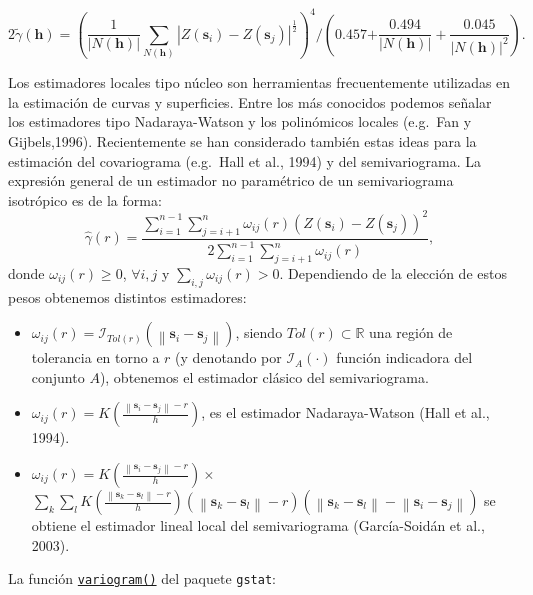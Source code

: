 \documentclass[
  spanish,
]{book}
\providecommand{\tightlist}{%
  \setlength{\itemsep}{0pt}\setlength{\parskip}{0pt}}
\theoremstyle{break}
\begin{document}
\[2\tilde{\gamma}(\mathbf{h}) = \left( \dfrac{1}{\left| N(\mathbf{h})\right| }
\sum\limits_{N(\mathbf{h})}\left| Z(\mathbf{s}_{i})-Z(\mathbf{s}_{j}
)\right|^{\frac{1}{2} } \right)^{4} /\left( \text{0.457+}
\dfrac{\text{0.494} }{\left| N(\mathbf{h})\right| } +\dfrac{\text{0.045}
}{\left| N(\mathbf{h})\right|^2 } \right).\]

Los estimadores locales tipo núcleo son herramientas frecuentemente utilizadas en la estimación de curvas y superficies.
Entre los más conocidos podemos señalar los estimadores tipo Nadaraya-Watson y los polinómicos locales (e.g.~Fan y Gijbels,1996).
Recientemente se han considerado también estas ideas para la estimación del covariograma (e.g.~Hall et al., 1994) y del semivariograma.
La expresión general de un estimador no paramétrico de un semivariograma isotrópico es de la forma:
\[\hat{\gamma}(r) = \dfrac{\sum\limits_{i=1}^{n-1}\sum\limits_{j=i+1}^{n}\omega_{ij}
(r)\left( Z(\mathbf{s}_{i})-Z(\mathbf{s}_{j})\right)^2  
}{2\sum\limits_{i=1}^{n-1}\sum\limits_{j=i+1}^{n}\omega_{ij}(r)},\]
donde \(\omega_{ij}(r) \geq 0\), \(\forall i,j\) y \(\sum_{i,j}\omega_{ij}(r) > 0\).
Dependiendo de la elección de estos pesos obtenemos distintos estimadores:

\begin{itemize}
\tightlist
\item
  \(\omega_{ij}(r) = \mathcal{I}_{Tol(r)} \left( \left\| \mathbf{s}_{i} - \mathbf{s}_{j} \right\| \right)\), siendo \(Tol(r)\subset \mathbb{R}\) una región de tolerancia en torno a \(r\) (y denotando por \(\mathcal{I}_{A}(\cdot)\) función indicadora del conjunto \(A\)), obtenemos el estimador clásico del semivariograma.
\item
  \(\omega_{ij}(r)=K\left( \frac{\left\| \mathbf{s}_{i} -\mathbf{s}_{j} \right\| -r}{h} \right)\), es el estimador Nadaraya-Watson (Hall et al., 1994).
\item
  \(\omega_{ij}(r)=K\left( \frac{\left\| \mathbf{s}_{i} -\mathbf{s}_{j} \right\| -r}{h} \right) \times\) \(\sum\limits_{k}\sum\limits_{l}K\left( \frac{\left\| \mathbf{s}_{k} -\mathbf{s}_{l} \right\| -r}{h} \right) \left( \left\| \mathbf{s}_{k} -\mathbf{s}_{l} \right\| -r\right) \left( \left\| \mathbf{s}_{k} -\mathbf{s}_{l} \right\| -\left\| \mathbf{s}_{i} -\mathbf{s}_{j} \right\| \right)\) se obtiene el estimador lineal local del semivariograma (García-Soidán et al., 2003).
\end{itemize}

La función \href{https://r-spatial.github.io/gstat/reference/variogram.html}{\texttt{variogram()}} del paquete \texttt{gstat}:
\end{document}
